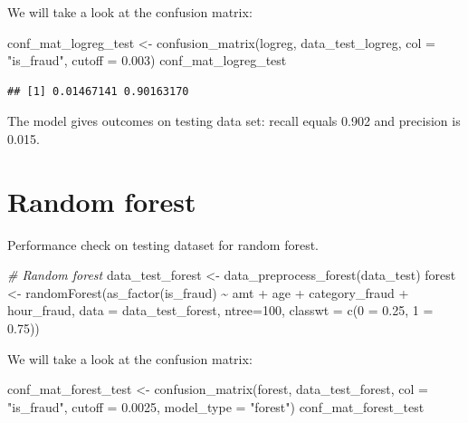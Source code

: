 \documentclass[
]{report}
\newenvironment{Shaded}{\begin{snugshade}}{\end{snugshade}}
\newcommand{\AttributeTok}[1]{\textcolor[rgb]{0.77,0.63,0.00}{#1}}
\newcommand{\CommentTok}[1]{\textcolor[rgb]{0.56,0.35,0.01}{\textit{#1}}}
\newcommand{\DecValTok}[1]{\textcolor[rgb]{0.00,0.00,0.81}{#1}}
\newcommand{\FloatTok}[1]{\textcolor[rgb]{0.00,0.00,0.81}{#1}}
\newcommand{\FunctionTok}[1]{\textcolor[rgb]{0.00,0.00,0.00}{#1}}
\newcommand{\NormalTok}[1]{#1}
\newcommand{\OtherTok}[1]{\textcolor[rgb]{0.56,0.35,0.01}{#1}}
\newcommand{\SpecialCharTok}[1]{\textcolor[rgb]{0.00,0.00,0.00}{#1}}
\newcommand{\StringTok}[1]{\textcolor[rgb]{0.31,0.60,0.02}{#1}}
\begin{document}
We will take a look at the confusion matrix:

\begin{Shaded}
\begin{Highlighting}[]
\NormalTok{conf\_mat\_logreg\_test }\OtherTok{\textless{}{-}} \FunctionTok{confusion\_matrix}\NormalTok{(logreg, data\_test\_logreg, }\AttributeTok{col =} \StringTok{"is\_fraud"}\NormalTok{, }\AttributeTok{cutoff =} \FloatTok{0.003}\NormalTok{)}
\NormalTok{conf\_mat\_logreg\_test}
\end{Highlighting}
\end{Shaded}

\begin{verbatim}
## [1] 0.01467141 0.90163170
\end{verbatim}

The model gives outcomes on testing data set: recall equals 0.902 and
precision is 0.015.

\hypertarget{random-forest-2}{%
\section{Random forest}\label{random-forest-2}}

Performance check on testing dataset for random forest.

\begin{Shaded}
\begin{Highlighting}[]
\CommentTok{\# Random forest}
\NormalTok{data\_test\_forest }\OtherTok{\textless{}{-}} \FunctionTok{data\_preprocess\_forest}\NormalTok{(data\_test)}
\NormalTok{forest }\OtherTok{\textless{}{-}} \FunctionTok{randomForest}\NormalTok{(}\FunctionTok{as\_factor}\NormalTok{(is\_fraud) }\SpecialCharTok{\textasciitilde{}}\NormalTok{ amt }\SpecialCharTok{+}\NormalTok{ age }\SpecialCharTok{+}\NormalTok{ category\_fraud }\SpecialCharTok{+}\NormalTok{ hour\_fraud,}
              \AttributeTok{data =}\NormalTok{ data\_test\_forest, }
              \AttributeTok{ntree=}\DecValTok{100}\NormalTok{, }
              \AttributeTok{classwt =} \FunctionTok{c}\NormalTok{(}\StringTok{\textquotesingle{}0\textquotesingle{}} \OtherTok{=} \FloatTok{0.25}\NormalTok{, }\StringTok{\textquotesingle{}1\textquotesingle{}} \OtherTok{=} \FloatTok{0.75}\NormalTok{))}
\end{Highlighting}
\end{Shaded}

We will take a look at the confusion matrix:

\begin{Shaded}
\begin{Highlighting}[]
\NormalTok{conf\_mat\_forest\_test }\OtherTok{\textless{}{-}} \FunctionTok{confusion\_matrix}\NormalTok{(forest, data\_test\_forest, }\AttributeTok{col =} \StringTok{"is\_fraud"}\NormalTok{, }\AttributeTok{cutoff =} \FloatTok{0.0025}\NormalTok{, }\AttributeTok{model\_type =} \StringTok{"forest"}\NormalTok{)}
\NormalTok{conf\_mat\_forest\_test}
\end{Highlighting}
\end{Shaded}
\end{document}
